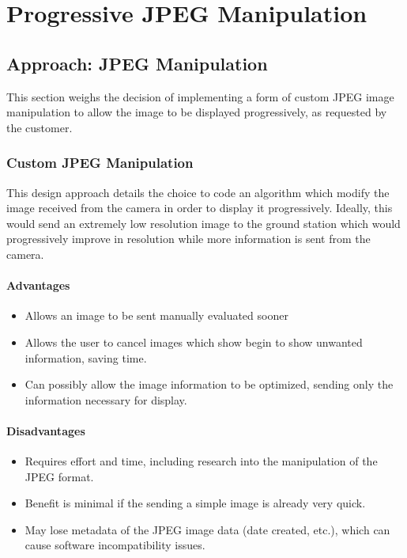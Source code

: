 \section{Progressive JPEG Manipulation}

\subsection{Approach: JPEG Manipulation}
\label{sec:jpegmanipulation}

This section weighs the decision of implementing a form of custom JPEG image manipulation to 
allow the image to be displayed progressively, as requested by the customer.

\subsubsection*{Custom JPEG Manipulation}

This design approach details the choice to code an algorithm which 
modify the image received from the camera in order to display it progressively. 
Ideally, this would send an extremely low resolution image to the ground station which 
would progressively improve in resolution while more information is sent from the camera.

\paragraph*{Advantages}
\begin{itemize}
	\item Allows an image to be sent manually evaluated sooner
	\item Allows the user to cancel images which show begin to show unwanted information, saving time.
	\item Can possibly allow the image information to be optimized, sending only the information necessary for display.
\end{itemize}

\paragraph*{Disadvantages}
\begin{itemize}
	\item Requires effort and time, including research into the manipulation of the JPEG format.
	\item Benefit is minimal if the sending a simple image is already very quick.
	\item May lose metadata of the JPEG image data (date created, etc.), which can cause software incompatibility issues.
\end{itemize}


